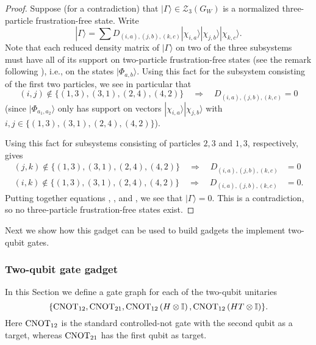 \documentclass[../thesis-main/thesis-main]{subfiles}
\begin{document}
\begin{proof}
Suppose (for a contradiction) that $|\Gamma\rangle\in\mathcal{Z}_{3}(G_{W})$ is a normalized three-particle frustration-free state. Write 
\[
|\Gamma\rangle=\sum D_{(i,a),(j,b),(k,c)}|\chi_{i,a}\rangle|\chi_{j,b}\rangle|\chi_{k,c}\rangle.
\]
Note that each reduced density matrix of $|\Gamma\rangle$ on two of the three subsystems must have all of its support on two-particle frustration-free states (see the remark following ), i.e., on the states $|\Phi_{a,b}\rangle$. Using this fact for the subsystem consisting of the first two particles, we see in particular that
\begin{equation}
(i,j)\notin\{(1,3),(3,1),(2,4),(4,2)\}\quad\Longrightarrow\quad D_{(i,a),(j,b),(k,c)}=0\label{eq:ij_constraint1}
\end{equation}
(since $|\Phi_{a_1,a_2}\rangle$ only has support on vectors $|\chi_{i,a}\rangle|\chi_{j,b}\rangle$ with $i,j\in \{(1,3),(3,1),(2,4),(4,2)\}$).

Using this fact for subsystems consisting of particles $2,3$ and $1,3$, respectively, gives 
\begin{align}
(j,k)\notin\{(1,3),(3,1),(2,4),(4,2)\}\quad\Longrightarrow\quad D_{(i,a),(j,b),(k,c)} & =0\label{eq:ij_constraint2}\\
(i,k)\notin\{(1,3),(3,1),(2,4),(4,2)\}\quad\Longrightarrow\quad D_{(i,a),(j,b),(k,c)} & =0.\label{eq:ij_constraint3}
\end{align}
Putting together equations , , and , we see that $|\Gamma\rangle=0$. This is a contradiction, so no three-particle frustration-free states exist.
\end{proof}

Next we show how this gadget can be used to build gadgets the implement two-qubit gates.

\subsubsection{Two-qubit gate gadget}


In this Section we define a gate graph for each of the two-qubit unitaries
\[
  \{\mathrm{CNOT}_{12}, \mathrm{CNOT}_{21}, \mathrm{CNOT}_{12}\left(H\otimes\mathbb{I}\right),
    \mathrm{CNOT}_{12}\left(HT\otimes\mathbb{I}\right)\}.
\]
Here $\mathrm{CNOT}_{12}$ is the standard controlled-not gate with the second qubit as a target, whereas $\mathrm{CNOT}_{21}$ has the first qubit as target.
\end{document}

